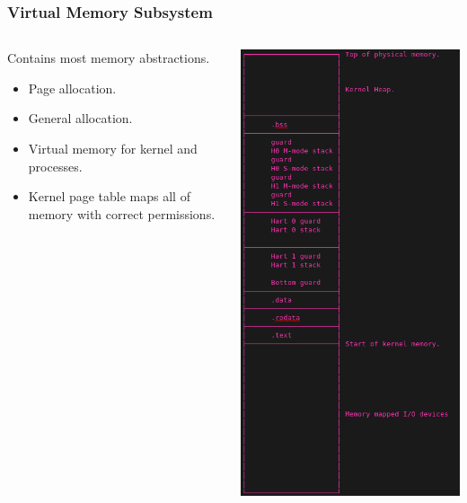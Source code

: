 \documentclass{beamer}
\begin{document}
\begin{frame}
  \frametitle{Virtual Memory Subsystem}
  \begin{columns}
    \begin{column}{0.5\textwidth}
      Contains most memory abstractions.
      \begin{itemize}
      \item Page allocation.\\
      \item General allocation.\\
      \item Virtual memory for kernel and processes.\\
      \item Kernel page table maps all of memory with correct permissions.
      \end{itemize}
    \end{column}
    \begin{column}{0.5\textwidth}
      \includegraphics[height=0.9\textheight]{memlayout.png}
    \end{column}
  \end{columns}
\end{frame}
\end{document}
